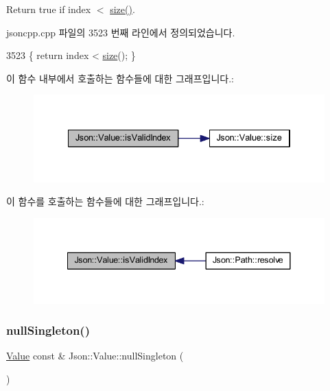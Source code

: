 Return true if index $<$ \hyperlink{class_json_1_1_value_a0ec2808e1d7efa4e9fad938d6667be44}{size()}. 



jsoncpp.\+cpp 파일의 3523 번째 라인에서 정의되었습니다.


\begin{DoxyCode}
3523 \{ \textcolor{keywordflow}{return} index < \hyperlink{class_json_1_1_value_a0ec2808e1d7efa4e9fad938d6667be44}{size}(); \}
\end{DoxyCode}
이 함수 내부에서 호출하는 함수들에 대한 그래프입니다.\+:
\nopagebreak
\begin{figure}[H]
\begin{center}
\leavevmode
\includegraphics[width=334pt]{class_json_1_1_value_ac2928f174a6e081c1500c28c2d61ee93_cgraph}
\end{center}
\end{figure}
이 함수를 호출하는 함수들에 대한 그래프입니다.\+:\nopagebreak
\begin{figure}[H]
\begin{center}
\leavevmode
\includegraphics[width=341pt]{class_json_1_1_value_ac2928f174a6e081c1500c28c2d61ee93_icgraph}
\end{center}
\end{figure}
\mbox{\label{class_json_1_1_value_af2f124567acc35d021a424e53ebdfcab}} 
\subsubsection{\texorpdfstring{null\+Singleton()}{nullSingleton()}}
{\footnotesize\ttfamily \hyperlink{class_json_1_1_value}{Value} const  \& Json\+::\+Value\+::null\+Singleton (\begin{DoxyParamCaption}{ }\end{DoxyParamCaption})\hspace{0.3cm}{\ttfamily [static]}}



